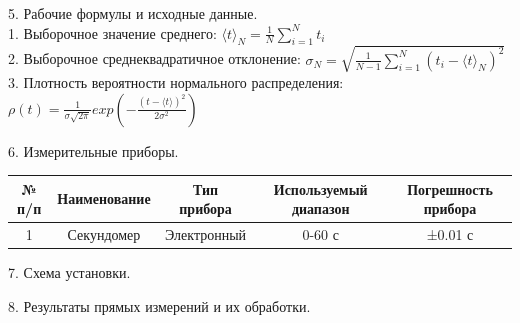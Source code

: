 \documentclass[12pt]{article}
\begin{document}
\begin{flushleft}
    5. Рабочие формулы и исходные данные. \\
    \hspace{0.63cm} 1. Выборочное значение среднего: $ \langle t \rangle _N = \frac{1}{N} \sum_{i=1}^{N}t_i $ \\
    \hspace{0.63cm} 2. Выборочное среднеквадратичное отклонение: $ \sigma_N = \sqrt{\frac{1}{N-1} \sum_{i=1}^{N} (t_i - \langle t \rangle_N)^2} $ \\
    \hspace{0.63cm} 3. Плотность вероятности нормального распределения: $ \rho(t) = \frac{1}{\sigma\sqrt{2\pi}} exp (-\frac{(t - \langle t \rangle)^2}{2 \sigma^2})$ \\
\end{flushleft}

\newpage

\begin{flushleft}
    6. Измерительные приборы.
\end{flushleft}

\begin{table}[h]
    \centering
    \renewcommand{\arraystretch}{1.5}
    {\itshape
    \begin{tabular}{|c|c|c|c|c|}
        \hline
        № п/п & Наименование & Тип прибора & Используемый диапазон & Погрешность прибора\\
        \hline
        1 & Секундомер & Электронный & 0-60 с & ±0.01 с\\
        \hline
    \end{tabular}
    }
\end{table}

\begin{flushleft}
    7. Схема установки.
\end{flushleft}

\begin{flushleft}
    8. Результаты прямых измерений и их обработки.
\end{flushleft}
\end{document}
